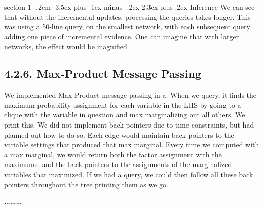 \documentclass[12pt]{article}
\makeatletter
\newenvironment{problem}{\@startsection
       {section}
       {1}
       {-.2em}
       {-3.5ex plus -1ex minus -.2ex}
       {2.3ex plus .2ex}
       {\pagebreak[3]%
       \large\bf\noindent{Problem }
       }
       }
       {%
       \begin{center}\large\bf \ldots\ldots\ldots\end{center}}
\makeatother
\begin{document}
\begin{problem}{Inference}
We can see that without the incremental updates, processing the queries takes longer.  This was using a 50-line query, on the smallest network, with each subsequent query adding one piece of incremental evidence.  One can imagine that with larger networks, the effect would be magnified.

\subsection*{4.2.6. Max-Product Message Passing}
We implemented Max-Product message passing in a.  When we query, it finds the maximum probability assignment for each variable in the LHS by going to a clique with the variable in question and max marginalizing out all others.  We print this.  We did not implement back pointers due to time constraints, but had planned out how to do so.  Each edge would maintain back pointers to the variable settings that produced that max marginal.  Every time we computed with a max marginal, we would return both the factor assignment with the maximums, and the back pointers to the assignments of the marginalized variables that maximized.  If we had a query, we could then follow all these back pointers throughout the tree printing them as we go.

\end{problem}{}
\end{document}
